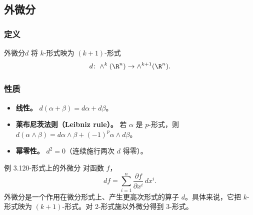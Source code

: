 \subsection{外微分}
\subsubsection{定义}
外微分$d$ 将 $k$-形式映为 $(k+1)$-形式
\[
  d\colon\wedge^k(\R^n)\to\wedge^{k+1}(\R^n).
\]

\subsubsection{性质}
\begin{itemize}
\item \textbf{线性。} $d(\alpha+\beta)=d\alpha+d\beta$。
\item \textbf{莱布尼茨法则（Leibniz rule）。} 若 $\alpha$ 是 $p$-形式，则 $d(\alpha\wedge\beta)=d\alpha\wedge\beta+(-1)^p\alpha\wedge d\beta$。
\item \textbf{幂零性。} $d^2=0$（连续施行两次 $d$ 得零）。
\end{itemize}

\begin{statement}{例 3.12}{0-形式上的外微分}
对函数 $f$，
\[
  df=\sum_{i=1}^n\frac{\partial f}{\partial x^i}\,dx^i.
\]
外微分是一个作用在微分形式上、产生更高次形式的算子 $d$。具体来说，它把 $k$-形式映为 $(k+1)$-形式。对 2-形式施以外微分得到 3-形式。
\end{statement}

